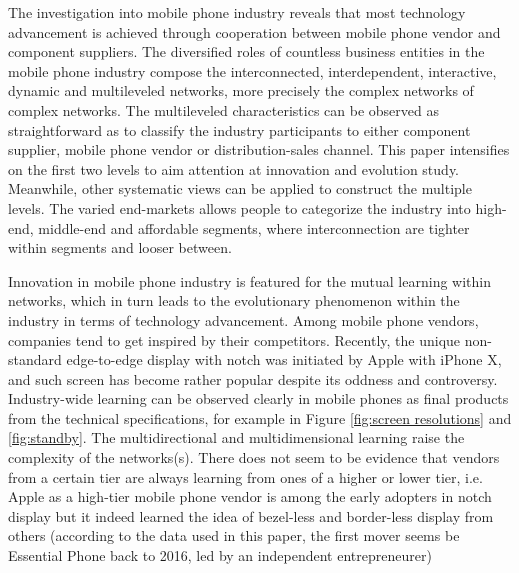 \documentclass[utf8,english]{gradu3}
\begin{document}
The investigation into mobile phone industry reveals that most technology advancement is achieved through cooperation between mobile phone vendor and component suppliers. The diversified roles of countless business entities in the mobile phone industry compose the interconnected, interdependent, interactive, dynamic and multileveled networks, more precisely the complex networks of complex networks. The multileveled characteristics can be observed as straightforward as to classify the industry participants to either component supplier, mobile phone vendor or distribution-sales channel. This paper intensifies on the first two levels to aim attention at innovation and evolution study. Meanwhile, other systematic views can be applied to construct the multiple levels. The varied end-markets allows people to categorize the industry into high-end, middle-end and affordable segments, where interconnection are tighter within segments and looser between.

Innovation in mobile phone industry is featured for the mutual learning within networks, which in turn leads to the evolutionary phenomenon within the industry in terms of technology advancement. Among mobile phone vendors, companies tend to get inspired by their competitors. Recently, the unique non-standard edge-to-edge display with notch was initiated by Apple with iPhone X, and such screen has become rather popular despite its oddness and controversy. Industry-wide learning can be observed clearly in mobile phones as final products from the technical specifications, for example in Figure \ref{fig:screen resolutions} and \ref{fig:standby}. The multidirectional and multidimensional learning raise the complexity of the networks(s). There does not seem to be evidence that vendors from a certain tier are always learning from ones of a higher or lower tier, i.e. Apple as a high-tier mobile phone vendor is among the early adopters in notch display but it indeed learned the idea of bezel-less and border-less display from others (according to the data used in this paper, the first mover seems be Essential Phone back to 2016, led by an independent entrepreneurer)
\end{document}
